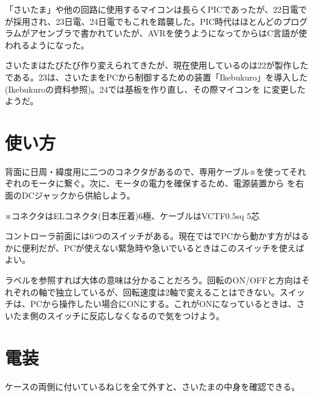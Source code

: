 \documentclass[letterpaper,10pt,dvipdfmx]{sphinxmanual}
\begin{document}
「さいたま」や他の回路に使用するマイコンは長らくPICであったが、22日電で が採用され、23日電、24日電でもこれを踏襲した。PIC時代はほとんどのプログラムがアセンブラで書かれていたが、AVRを使うようになってからはC言語が使われるようになった。

さいたまはたびたび作り変えられてきたが、現在使用しているのは22が製作した である。23は、さいたまをPCから制御するための装置「Ikebukuro」を導入した(Ikebukuroの資料参照)。24では基板を作り直し、その際マイコンを に変更したようだ。


\section{使い方}
\label{\detokenize{nissyu-idohen/saitama:}}\label{\detokenize{nissyu-idohen/saitama:id4}}

背面に日周・緯度用に二つのコネクタがあるので、専用ケーブル※を使ってそれぞれのモータに繋ぐ。次に、モータの電力を確保するため、電源装置から を右面のDCジャックから供給しよう。

※コネクタはELコネクタ(日本圧着)6極、ケーブルはVCTF0.5sq 5芯


コントローラ前面には6つのスイッチがある。現在では{\hyperref[\detokenize{nissyu-idohen/ikebukuro::doc}]{}}でPCから動かす方がはるかに便利だが、PCが使えない緊急時や急いでいるときはこのスイッチを使えばよい。

ラベルを参照すれば大体の意味は分かることだろう。回転のON/OFFと方向はそれぞれの軸で独立しているが、回転速度は2軸で変えることはできない。スイッチは、PCから操作したい場合にONにする。これがONになっているときは、さいたま側のスイッチに反応しなくなるので気をつけよう。


\section{電装}
\label{\detokenize{nissyu-idohen/saitama:}}\label{\detokenize{nissyu-idohen/saitama:id5}}
ケースの両側に付いているねじを全て外すと、さいたまの中身を確認できる。
\end{document}
